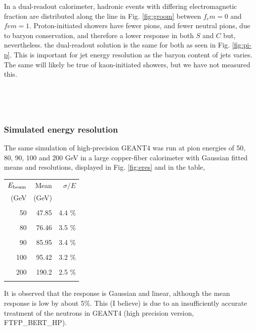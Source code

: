  In a dual-readout calorimeter, hadronic events with differing
electromagnetic fraction are distributed along the line in Fig. \ref{fig:groom} between $f_em=0$ and $fem=1$.  Proton-initiated
showers have fewer pions, and  fewer neutral pions, due to baryon conservation, and  therefore a lower response in both $S$ and $C$ but,
nevertheless. the dual-readout solution is the same for both as seen in Fig. \ref{fig:pi-p}.  This is important for jet energy resolution as the baryon  
content of jets varies.  The same will likely be true of kaon-initiated showers, but we have not measured this. 




~~~~~~~~~~~~~~~~~~~~~~~~~~~~~~~~~~~~~~~~~~~~~

~~~~~~~~~~~~~~~~~~~~~~~~~~~~~~~~~~~~~~~~~~~~~

\subsubsection{Simulated energy resolution}                \label{sec:Eres}  

The same simulation of high-precision GEANT4 was run at pion energies of 50, 80, 90, 100 and 200 GeV in a large
copper-fiber calorimeter with Gaussian fitted  means and resolutions, displayed in Fig. \ref{fig:eres} and in the table,

\bigskip

\begin{tabular}{ r r r }
$E_{\rm beam}$   &  Mean         &  $\sigma/E$ \\
   (GeV    &   (GeV)       &   \\
\hline
 & & \\
 50    &    47.85   & 4.4 \% \\
 &&\\
 80   & 76.46     &  3.5 \% \\
 &&\\
 90  & 85.95    &   3.4 \% \\
 &&\\
 100  & 95.42  &  3.2 \% \\
 &&\\
 200  & 190.2  &  2.5 \% \\
 &&\\
 \end{tabular}

\bigskip

 It is observed that the response is Gaussian and linear, although the mean response is low by about 5\%.  This (I believe) is due to an insufficiently accurate treatment of the neutrons in GEANT4 (high precision version, FTFP\_BERT\_HP).


